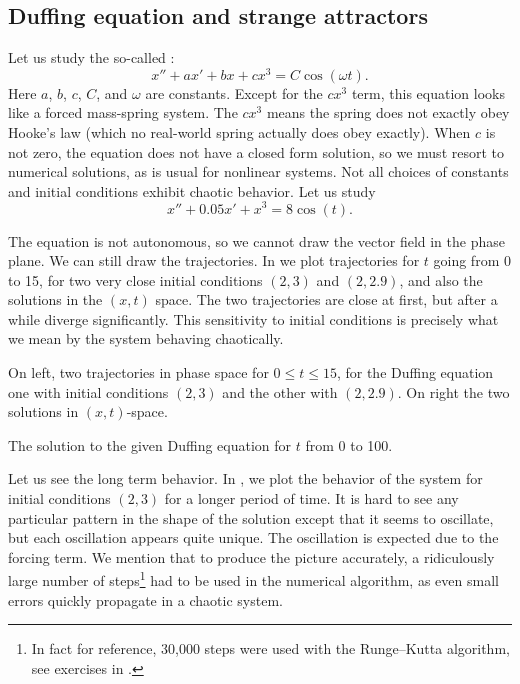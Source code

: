 \subsection{Duffing equation and strange attractors}

Let us study the so-called \emph{}:
\begin{equation*}
x'' + a x' + bx + cx^3 = C \cos(\omega t) .
\end{equation*}
Here $a$, $b$, $c$, $C$, and $\omega$ are constants.
Except for the $c x^3$ term, this equation looks like
a forced mass-spring system.  The $c x^3$ means the spring does
not exactly obey Hooke's law (which no real-world spring actually does obey
exactly).  When $c$ is not zero, the equation does not have a closed
form solution, so we must resort to numerical solutions, as is usual for
nonlinear systems.  Not all choices of constants and initial conditions
exhibit chaotic behavior.  Let us study
\begin{equation*}
x''+0.05 x' + x^3 = 8\cos(t) .
\end{equation*}

The equation is not autonomous, so we cannot 
draw the vector field in the phase plane.
We can still draw the
trajectories.   
In  we plot trajectories for $t$ going from 0
to 15, for two very close initial conditions
$(2,3)$ and $(2,2.9)$, and also the solutions in the $(x,t)$ space.  The two
trajectories are close at first, but after a while diverge significantly.
This sensitivity to initial conditions is precisely what
we mean by the system behaving chaotically.

\begin{myfig}
\capstart
\caption{On left, two trajectories in phase space for $0 \leq t \leq 15$, for the Duffing equation
one with initial conditions $(2,3)$ and the other with $(2,2.9)$.  On
right the two solutions in $(x,t)$-space. \label{nlin:duf-two-traj}}
\end{myfig}

\begin{myfig}
\capstart
{}
\caption{The solution to the given Duffing equation for $t$ from 0 to 100.
\label{nlin:duf-long}}
\end{myfig}

\pagebreak[2]
Let us see the long term behavior.
In ,
we plot the behavior of the system for initial conditions $(2,3)$ for
a longer period of time.
It is hard to see any particular pattern
in the shape of the solution except that it seems to oscillate, but each
oscillation appears quite unique.  The oscillation
is expected due to the forcing term.
We mention that to produce the picture accurately,
a ridiculously large number of steps\footnote{In
fact for reference, 30,000 steps were used with the Runge--Kutta
algorithm, see exercises in .}
had to be used in the numerical
algorithm,
as even small errors quickly propagate in a chaotic system.


